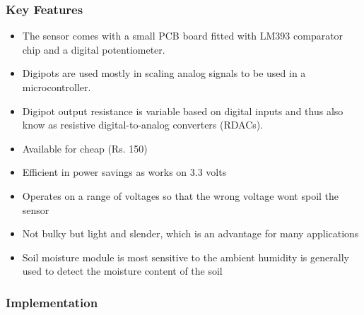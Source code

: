\documentclass[16pt]{article}
\begin{document}
\vspace{0.5cm}
\subsubsection{Key Features}

\begin{itemize}

\item
  The sensor comes with a small PCB board fitted with LM393 comparator
  chip and a digital potentiometer.
\item
  Digipots are used mostly in scaling analog signals to be used in a
  microcontroller.
\item
  Digipot output resistance is variable based on digital inputs and thus
  also know as resistive digital-to-analog converters (RDACs).
\item
  Available for cheap (Rs. 150)
\item
  Efficient in power savings as works on 3.3 volts
\item
  Operates on a range of voltages so that the wrong voltage wont spoil
  the sensor
\item
  Not bulky but light and slender, which is an advantage for many
  applications
\item
  Soil moisture module is most sensitive to the ambient humidity is
  generally used to detect the \vspace{0.5cm}moisture content of the soil
\end{itemize}

\subsubsection{Implementation}
\end{document}
